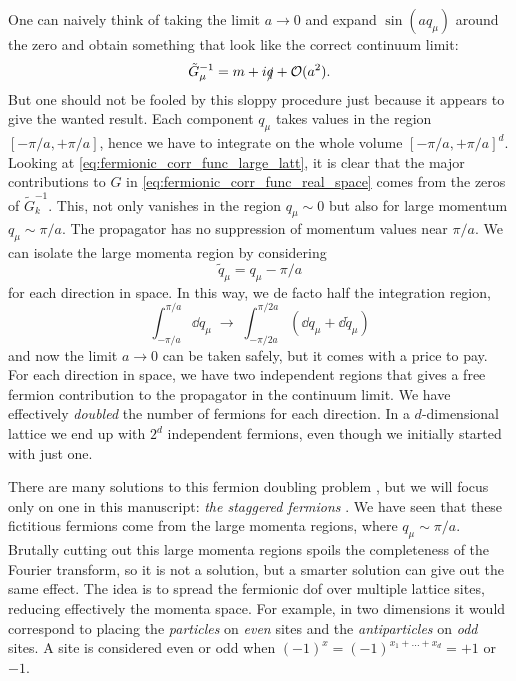 One can naively think of taking the limit $a \to 0$ and expand $\sin(a q_{\mu})$ around the zero and obtain something that look like the correct continuum limit:
\begin{equation}
    \tilde{G}_{\mu}^{-1} = m + i \slashed{q} + \mathcal{O}(a^2).
\end{equation}
But one should not be fooled by this sloppy procedure just because it appears to give the wanted result.
Each component $q_{\mu}$ takes values in the region $[-\pi/a, +\pi/a]$, hence we have to integrate on the whole volume $[-\pi/a, +\pi/a]^d$.
Looking at \eqref{eq:fermionic_corr_func_large_latt}, it is clear that the major contributions to $G$ in \eqref{eq:fermionic_corr_func_real_space} comes from the zeros of $\tilde{G}_k^{-1}$.
This, not only vanishes in the region $q_{\mu} \sim 0$ but also for large momentum $q_{\mu} \sim \pi/a$.
The propagator has no suppression of momentum values near $\pi/a$.
We can isolate the large momenta region by considering
\begin{equation}
    \tilde{q}_{\mu} = q_{\mu} - \pi/a
\end{equation}
for each direction in space.
In this way, we de facto half the integration region,
\begin{equation}
    \int_{-\pi/a}^{\pi/a} \dd q_{\mu} \;\to\;
    \int_{-\pi/2a}^{\pi/2a} (\dd q_{\mu} + \dd \tilde{q}_{\mu})
\end{equation}
and now the limit $a \to 0$ can be taken safely, but it comes with a price to pay.
For each direction in space, we have two independent regions that gives a free fermion contribution to the propagator in the continuum limit.
We have effectively \emph{doubled} the number of fermions for each direction.
In a $d$-dimensional lattice we end up with $2^d$ independent fermions, even though we initially started with just one.

There are many solutions to this fermion doubling problem \cite{susskind1977fermions, tong2018gauge}, but we will focus only on one in this manuscript: \emph{the staggered fermions} \cite{kogut1975hamiltonian, susskind1977fermions}.
We have seen that these fictitious fermions come from the large momenta regions, where $q_{\mu} \sim \pi/a$.
Brutally cutting out this large momenta regions spoils the completeness of the Fourier transform, so it is not a solution, but a smarter solution can give out the same effect.
The idea is to spread the fermionic \ac{dof} over multiple lattice sites, reducing effectively the momenta space.
For example, in two dimensions it would correspond to placing the \emph{particles} on \emph{even} sites and the \emph{antiparticles} on \emph{odd} sites.
A site is considered even or odd when $(-1)^x = (-1)^{x_1 + \dots + x_d} = +1$ or $-1$.

